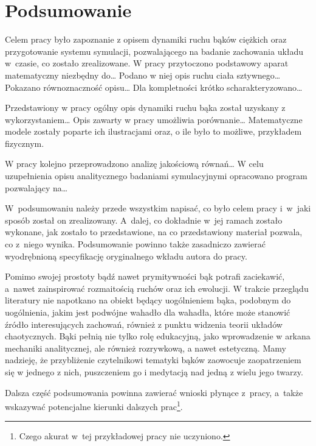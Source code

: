 \chapter{Podsumowanie}

Celem pracy było zapoznanie z opisem dynamiki ruchu bąków ciężkich oraz przygotowanie systemu symulacji, pozwalającego na badanie zachowania układu w~czasie, co zostało zrealizowane. W pracy przytoczono podstawowy aparat matematyczny niezbędny do\ldots{} Podano w niej opis ruchu ciała sztywnego\ldots{} Pokazano równoznaczność opisu\ldots{} Dla kompletności krótko scharakteryzowano\ldots

Przedstawiony w pracy ogólny opis dynamiki ruchu bąka został uzyskany z wykorzystaniem\ldots{} Opis zawarty w pracy umożliwia porównanie\ldots{} Matematyczne modele zostały poparte ich ilustracjami oraz, o ile było to możliwe, przykładem fizycznym.

W pracy kolejno przeprowadzono analizę jakościową równań\ldots{} W celu uzupełnienia opisu analitycznego badaniami symulacyjnymi opracowano program pozwalający na\ldots{}

{\red
  W~podsumowaniu należy przede wszystkim napisać, co było celem pracy i~w~jaki sposób został on zrealizowany. A~dalej, co dokładnie w~jej ramach zostało wykonane, jak zostało to przedstawione, na co przedstawiony materiał pozwala, co z~niego wynika. Podsumowanie powinno także zasadniczo zawierać wyodrębnioną specyfikację oryginalnego wkładu autora do pracy.}

Pomimo swojej prostoty bądź nawet prymitywności bąk potrafi zaciekawić, a~nawet zainspirować rozmaitością ruchów oraz ich ewolucji. W trakcie przeglądu literatury nie napotkano na obiekt będący uogólnieniem bąka, podobnym do uogólnienia, jakim jest podwójne wahadło dla wahadła, które może stanowić źródło interesujących zachowań, również z punktu widzenia teorii układów chaotycznych. Bąki pełnią nie tylko rolę edukacyjną, jako wprowadzenie w arkana mechaniki analitycznej, ale również rozrywkową, a nawet estetyczną. Mamy nadzieję, że przybliżenie czytelnikowi tematyki bąków zaowocuje zaopatrzeniem się w jednego z nich, puszczeniem go i medytacją nad jedną z wielu jego twarzy.

{\red
  Dalsza część podsumowania powinna zawierać wnioski płynące z~pracy, a~także wskazywać potencjalne kierunki dalszych prac\footnote{\red Czego akurat w~tej przykładowej pracy nie uczyniono.}.}
